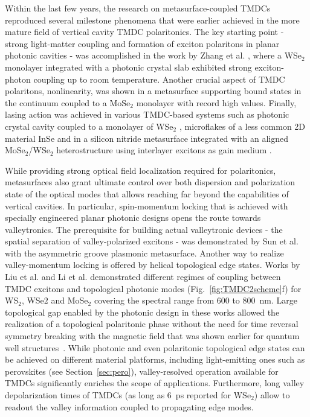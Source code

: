 \documentclass[journal=chreay,manuscript=review]{achemso}
\begin{document}
Within the last few years, the research on metasurface-coupled TMDCs reproduced several milestone phenomena that were earlier achieved in the more mature field of vertical cavity TMDC polaritonics. The key starting point - strong light-matter coupling and formation of exciton polaritons in planar photonic cavities -  was accomplished in the work by Zhang et al. \cite{zhang2018photonic}, where a WSe$_2$ monolayer integrated with a photonic crystal slab exhibited strong exciton-photon coupling up to room temperature. Another crucial aspect of TMDC polaritons, nonlinearity, was shown in a metasurface supporting bound states in the continuum coupled to a MoSe$_2$ monolayer \cite{kravtsov2020nonlinear} with record high values. Finally, lasing action was achieved in various TMDC-based systems such as photonic crystal cavity coupled to a monolayer of WSe$_2$ \cite{wu2015monolayer},  microflakes of a less common 2D material InSe\cite{li2022room} and in a silicon nitride metasurface integrated with an aligned MoSe$_2$/WSe$_2$ heterostructure using interlayer excitons as gain medium \cite{paik2019interlayer}. 

While providing strong optical field localization required for polaritonics, metasurfaces also grant ultimate control over both dispersion and polarization state of the optical modes that allows reaching far beyond the capabilities of vertical cavities. In particular, spin-momentum locking that is achieved with specially engineered planar photonic designs opens the route towards valleytronics\cite{schaibley2016valleytronics}.  The prerequisite for building actual valleytronic devices - the spatial separation of valley-polarized excitons - was demonstrated by Sun et al. \cite{sun2019separation} with the asymmetric groove plasmonic metasurface. Another way to realize valley-momentum locking is offered by helical topological edge states. Works by Liu et al. \cite{liu2020generation} and Li et al. \cite{li2021experimental} demonstrated different regimes of coupling between TMDC excitons and topological photonic modes (Fig.~\ref{fig:TMDC2scheme}f) for WS$_2$, WSe$2$ and MoSe$_2$ covering the spectral range from 600 to 800~nm. Large topological gap enabled by the photonic design in these works allowed the realization of a topological polaritonic phase without the need for time reversal symmetry breaking with the magnetic field that was shown earlier for quantum well structures~\cite{klembt2018exciton}. While photonic and even polaritonic topological edge states can be achieved on different material platforms, including light-emitting ones such as perovskites (see Section~\ref{sec:pero}), valley-resolved operation available for TMDCs significantly enriches the scope of applications. Furthermore, long valley depolarization times of TMDCs (as long as 6~ps reported for WSe$_2$\cite{zhu2014exciton}) allow to readout the valley information coupled to propagating edge modes\cite{liu2020generation,li2021experimental}.
\end{document}
